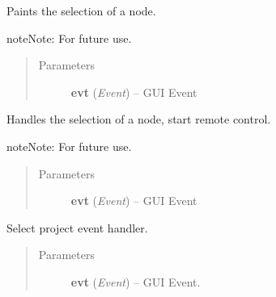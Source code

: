 \documentclass[letterpaper,10pt,english]{sphinxmanual}
\begin{document}
\begin{fulllineitems}
\begin{fulllineitems}
\label{wos:wos.GUI.PaintSelect}
Paints the selection of a node.

\begin{notice}{note}{Note:}
For future use.
\end{notice}
\begin{quote}\begin{description}
\item[{Parameters}] \leavevmode
\textbf{evt} (\emph{Event}) -- GUI Event

\end{description}\end{quote}

\end{fulllineitems}


\begin{fulllineitems}
\label{wos:wos.GUI.SelectNode}
Handles the selection of a node, start remote control.

\begin{notice}{note}{Note:}
For future use.
\end{notice}
\begin{quote}\begin{description}
\item[{Parameters}] \leavevmode
\textbf{evt} (\emph{Event}) -- GUI Event

\end{description}\end{quote}

\end{fulllineitems}


\begin{fulllineitems}
\label{wos:wos.GUI.SelectProjectDialog}
Select project event handler.
\begin{quote}\begin{description}
\item[{Parameters}] \leavevmode
\textbf{evt} (\emph{Event}) -- GUI Event.

\end{description}\end{quote}


\end{fulllineitems}
\end{fulllineitems}
\end{document}

